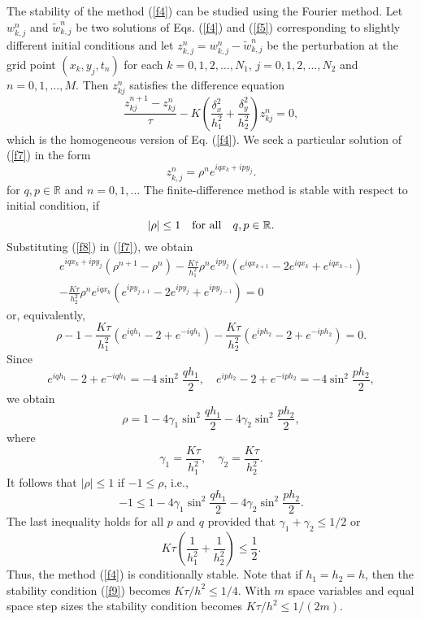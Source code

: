 \vskip 0.3cm  
The stability of the method (\ref{f4}) can be studied using the Fourier method.
Let $w^{n}_{k,j}$ and $\tilde{w}^{n}_{k,j}$ be two solutions of Eqs. (\ref{f4})
and (\ref{f5}) corresponding to slightly different initial conditions and
let $z^{n}_{k,j}=w^{n}_{k,j}-\tilde{w}^{n}_{k,j}$ be
the perturbation at the grid point $(x_{k}, y_{j}, t_{n})$ for each
$k=0,1,2, \dots, N_{1}$,
$j=0,1,2, \dots, N_{2}$ and $n=0,1, \dots,M$.
Then $z^{n}_{kj}$ satisfies the difference equation
\begin{equation}
\frac{z_{kj}^{n+1}-z_{kj}^{n}}{\tau} -K\left(\frac{\delta_{x}^2}{h_{1}^2}
+\frac{\delta_{y}^2}{h_{2}^2}\right)z_{kj}^{n}=0, \label{f7}
\end{equation}
which is the homogeneous version of Eq. (\ref{f4}).
We seek a particular solution of
(\ref{f7}) in the form
\begin{equation}
z^{n}_{k,j}=\rho^{n}e^{iqx_{k}+ipy_{j}}. \label{f8}
\end{equation}
for $q,p\in{\mathbb R}$ and $n=0,1,\dots$
The finite-difference method is stable with respect to
initial condition, if
\[
\vert\rho\vert\leq 1 \quad {\rm for \ all } \quad q,p\in{\mathbb R}.
\]
Substituting (\ref{f8}) in (\ref{f7}), we obtain
\begin{multline*}
e^{iqx_{k}+ipy_{j}}\left(\rho^{n+1}-\rho^{n}\right) -
\frac{K\tau}{h_{1}^2}\rho^{n}e^{ipy_{j}}
\left(e^{iqx_{k+1}}-2e^{iqx_{k}}+e^{iqx_{k-1}}\right)\\
-\frac{K\tau}{h_{2}^2}\rho^{n}e^{iqx_{k}}
\left(e^{ipy_{j+1}}-2e^{ipy_{j}}+e^{ipy_{j-1}}\right)=0
\end{multline*}
or, equivalently,
\[
\rho-1-\frac{K\tau}{h_{1}^2}
\left(e^{iqh_{1}}-2+e^{-iqh_{1}}\right)-
\frac{K\tau}{h_{2}^2}\left(e^{iph_{2}}-2+e^{-iph_{2}}\right)=0.
\]
Since
\[
e^{iqh_{1}}-2+e^{-iqh_{1}}=-4\sin^{2} \frac{qh_{1}}{2}, \quad
e^{iph_{2}}-2+e^{-iph_{2}}=-4\sin^{2} \frac{ph_{2}}{2},
\]
we obtain
\[
\rho=1-4\gamma_{1}\sin^{2} \frac{qh_{1}}{2}
-4\gamma_{2}\sin^{2} \frac{ph_{2}}{2},
\]
where
\[
\gamma_{1}=\frac{K\tau}{h_{1}^2}, \quad
\gamma_{2}=\frac{K\tau}{h_{2}^2}.
\]
It follows that $\vert\rho\vert\leq 1$ if $-1\leq\rho$, i.e.,
\[
-1\leq 1-4\gamma_{1}\sin^{2} \frac{qh_{1}}{2}
-4\gamma_{2}\sin^{2} \frac{ph_{2}}{2}.
\]
The last inequality holds for all $p$ and $q$ provided that $\gamma_{1}+\gamma_{2}\leq 1/2$
or
\begin{equation}
K\tau
\left(\frac{1}{h_{1}^2}+\frac{1}{h_{2}^2}\right)\leq\frac{1}{2}. \label{f9}
\end{equation}
Thus, the method (\ref{f4}) is conditionally stable. Note that if
$h_{1}=h_{2}=h$, then the stability condition (\ref{f9}) becomes
$K\tau/h^2\leq 1/4$. With $m$ space variables and equal space step
sizes the stability condition becomes $K\tau/h^2\leq 1/(2m)$.



